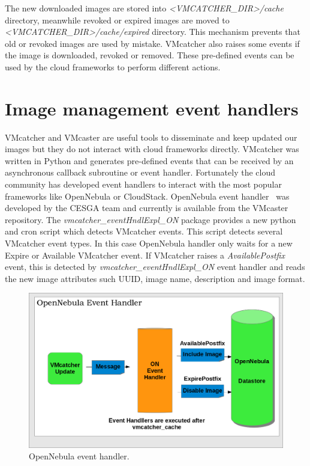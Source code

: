 \documentclass{llncs_Ibergrid2013}
\begin{document}
The new downloaded images are stored into \textit{<VMCATCHER\_DIR>/cache} directory, meanwhile revoked or expired images are moved to \textit{<VMCATCHER\_DIR>/cache/expired} directory. 
This mechanism prevents that old or revoked images are used by mistake. VMcatcher also raises some events if the image is downloaded, revoked or removed. 
These pre-defined events can be used by the cloud frameworks to perform different actions.

\section{Image management event handlers}
\label{sect-handlers}
VMcatcher and VMcaster are useful tools to disseminate and keep updated our images but they do not interact with cloud frameworks directly.
VMcatcher was written in Python and generates pre-defined events that can be received by an asynchronous callback subroutine or event handler.
Fortunately the cloud community has developed event handlers to interact with the most popular frameworks like OpenNebula or CloudStack.
OpenNebula event handler~\cite{onevent} was developed by the CESGA team and currently is available from the VMcaster repository. 
The \textit{vmcatcher\_eventHndlExpl\_ON} package provides a new python and cron script which detects VMcatcher events. 
This script detects several VMcatcher event types. In this case OpenNebula handler only waits for a new Expire or Available VMcatcher event.
If VMcatcher raises a \textit{AvailablePostfix} event, this is detected by \textit{vmcatcher\_eventHndlExpl\_ON} event handler and reads the new image attributes such UUID, image name, description and image format.
\begin{figure}[h]
\centering
\includegraphics[width=1\textwidth]{ONeventhandler.png}
\caption{OpenNebula event handler.}
\label{fig:onevent}
\end{figure}
\end{document}
